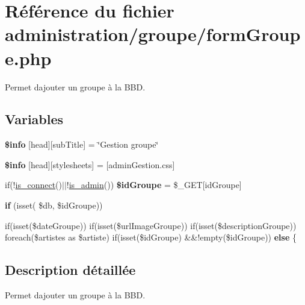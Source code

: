 \hypertarget{formGroupe_8php}{}\section{Référence du fichier administration/groupe/form\+Groupe.php}
\label{formGroupe_8php}


Permet d\textquotesingle{}ajouter un groupe à la B\+BD.  


\subsection*{Variables}
\begin{DoxyCompactItemize}
\item 
\mbox{\label{formGroupe_8php_a024f87f9bf4f3b33710e2e7ff8f60823}} 
{\bfseries \$info} \mbox{[}\textquotesingle{}head\textquotesingle{}\mbox{]}\mbox{[}\textquotesingle{}sub\+Title\textquotesingle{}\mbox{]} = \char`\"{}Gestion groupe\char`\"{}
\item 
\mbox{\label{formGroupe_8php_af6044c8bf78ebc8c58057e14d7738bbd}} 
{\bfseries \$info} \mbox{[}\textquotesingle{}head\textquotesingle{}\mbox{]}\mbox{[}\textquotesingle{}stylesheets\textquotesingle{}\mbox{]} = \mbox{[}\textquotesingle{}admin\+Gestion.\+css\textquotesingle{}\mbox{]}
\item 
\mbox{\label{formGroupe_8php_a268413961d9923d3e83d901192130242}} 
if(!\hyperlink{fonctionCompte_8php_a2fe594e0482307b8729ea37780d6f74b}{is\+\_\+connect}()$\vert$$\vert$!\hyperlink{fonctionCompte_8php_a0b327581800dba50ad70720e23ae2ed2}{is\+\_\+admin}()) {\bfseries \$id\+Groupe} = \$\+\_\+\+G\+ET\mbox{[}\textquotesingle{}id\+Groupe\textquotesingle{}\mbox{]}
\item 
\mbox{\label{formGroupe_8php_aaf4d3206f9167789cb027aa8f00145e8}} 
{\bfseries if} (isset( \$db, \$id\+Groupe))
\item 
\mbox{\label{formGroupe_8php_a82b7d2e9374383334ccb0e98a0973c84}} 
if(isset(\$date\+Groupe)) if(isset(\$url\+Image\+Groupe)) if(isset(\$description\+Groupe)) foreach(\$artistes as \$artiste) if(isset(\$id\+Groupe) \&\&!empty(\$id\+Groupe)) {\bfseries else} \{
\end{DoxyCompactItemize}


\subsection{Description détaillée}
Permet d\textquotesingle{}ajouter un groupe à la B\+BD. 

